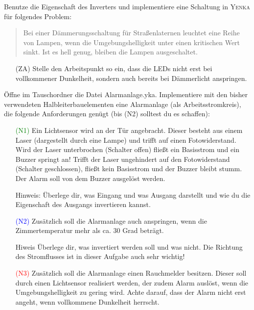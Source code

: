 \begin{Aufgabe} \label{Aufg:Daemmerung}
Benutze die Eigenschaft des Inverters und implementiere eine Schaltung in \textsc{Yenka} für folgendes Problem:

\begin{quote}
Bei einer Dämmerungsschaltung für Straßenlaternen leuchtet eine Reihe von Lampen, wenn die Umgebungshelligkeit unter einen kritischen Wert sinkt. Ist es hell genug, bleiben die Lampen ausgeschaltet.
\end{quote}

\begin{itemize}
\item[(ZA)] Stelle den Arbeitspunkt so ein, dass die LEDs nicht erst bei vollkommener Dunkelheit, sondern auch bereits bei Dämmerlicht anspringen.
\end{itemize}

\end{Aufgabe}


\begin{Aufgabe} \label{Aufg:TransistorKomplex}
Öffne im Tauschordner die Datei Alarmanlage.yka.
Implementiere mit den bisher verwendeten Halbleiterbauelementen eine Alarmanlage (als Arbeitsstromkreis), die folgende Anforderungen genügt (bis (N2) solltest du es schaffen):
\begin{itemize}
\item[\textcolor{green}{(N1)}] Ein Lichtsensor wird an der Tür angebracht. Dieser besteht aus einem Laser (dargestellt durch eine Lampe) und trifft auf einen Fotowiderstand. Wird der Laser unterbrochen (Schalter offen) fließt ein Basisstrom und ein Buzzer springt an! Trifft der Laser ungehindert auf den Fotowiderstand (Schalter geschlossen), fließt kein Basisstrom und der Buzzer bleibt stumm.
Der Alarm soll von dem Buzzer ausgelöst werden.

Hinweis: \textcolor{grau}{Überlege dir, was Eingang und was Ausgang darstellt und wie du die Eigenschaft des Ausgangs invertieren kannst.}
\item[\textcolor{blue}{(N2)}] Zusätzlich soll die Alarmanlage auch anspringen, wenn die Zimmertemperatur mehr als ca. 30 Grad beträgt.

Hiweis \textcolor{grau}{Überlege dir, was invertiert werden soll und was nicht. Die Richtung des Stromflusses ist in dieser Aufgabe auch sehr wichtig!}
\item[\textcolor{red}{(N3)}] Zusätzlich soll die Alarmanlage einen Rauchmelder besitzen. Dieser soll durch einen Lichtsensor realisiert werden, der zudem Alarm auslöst, wenn die Umgebungshelligkeit zu gering wird. Achte darauf, dass der Alarm nicht erst angeht, wenn vollkommene Dunkelheit herrscht.
\end{itemize}
\end{Aufgabe}



